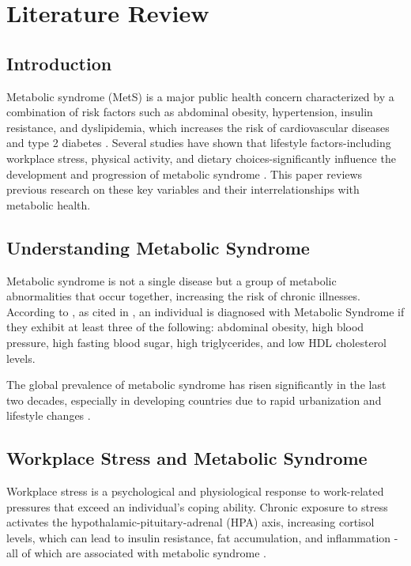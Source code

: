 \chapter{Literature Review}

\section{Introduction}

Metabolic syndrome (MetS) is a major public health concern characterized by a combination of risk factors such as abdominal obesity, hypertension, insulin resistance, and dyslipidemia, which increases the risk of cardiovascular diseases and type 2 diabetes \citep{peterseim2024metabolic}. Several studies have shown that lifestyle factors-including workplace stress, physical activity, and dietary choices-significantly influence the development and progression of metabolic syndrome \citep{chukwuemeka2025metabolic, gallardo2023diet, chomiuk2024physical}. This paper reviews previous research on these key variables and their interrelationships with metabolic health.

\section{Understanding Metabolic Syndrome}

Metabolic syndrome is not a single disease but a group of metabolic abnormalities that occur together, increasing the risk of chronic illnesses. According to \cite{idf2006_metabolic}, as cited in \cite{alberti2009harmonizing}, an individual is diagnosed with Metabolic Syndrome if they exhibit at least three of the following: abdominal obesity, high blood pressure, high fasting blood sugar, high triglycerides, and low HDL cholesterol levels. \par
The global prevalence of metabolic syndrome has risen significantly in the last two decades, especially in developing countries due to rapid urbanization and lifestyle changes \citep{adeboye2012epidemiology}.

\section{Workplace Stress and Metabolic Syndrome}

Workplace stress is a psychological and physiological response to work-related pressures that exceed an individual's coping ability. Chronic exposure to stress activates the hypothalamic-pituitary-adrenal (HPA) axis, increasing cortisol levels, which can lead to insulin resistance, fat accumulation, and inflammation - all of which are associated with metabolic syndrome \citep{chrousos2009stress}.


